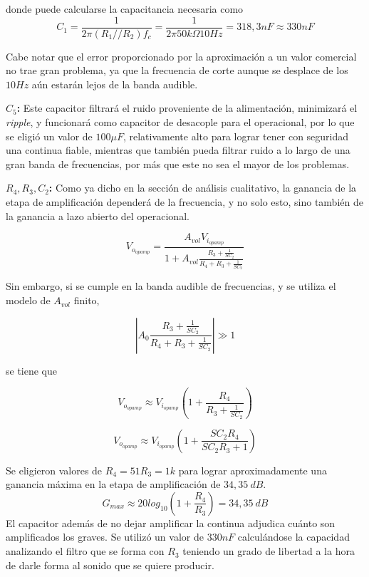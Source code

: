 donde puede calcularse la capacitancia necesaria como
\begin{equation}
C_1=\frac{1}{2\pi (R_1//R_2) f_c} = \frac{1}{2\pi 50k\Omega 10Hz} = 318,3nF \approx 330nF
\end{equation}

Cabe notar que el error proporcionado por la aproximación a un valor comercial no trae gran problema, ya que la frecuencia de corte aunque se desplace de los $10Hz$ aún estarán lejos de la banda audible.

\textbf{$C_5$:} Este capacitor filtrará el ruido proveniente de la alimentación, minimizará el \textit{ripple}, y funcionará como capacitor de desacople para el operacional, por lo que se eligió un valor de $100\mu F$, relativamente alto para lograr tener con seguridad una continua fiable, mientras que también pueda filtrar ruido a lo largo de una gran banda de frecuencias, por más que este no sea el mayor de los problemas.

\textbf{$R_4, R_3, C_2$:} Como ya dicho en la sección de análisis cualitativo, la ganancia de la etapa de amplificación dependerá de la frecuencia, y no solo esto, sino también de la ganancia a lazo abierto del operacional.

\begin{equation}
	V_{o_{opamp}} = \frac{A_{vol} V_{i_{opamp}}}{1+A_{vol} \frac{R_3 + \frac{1}{SC_2}}{R_4 + R_3 + \frac{1}{SC_2}}}
\end{equation}

Sin embargo, si se cumple en la banda audible de frecuencias, y se utiliza el modelo de $A_{vol}$ finito,

\begin{equation}
\left| A_{0}\frac{R_3 + \frac{1}{SC_2}}{R_4 + R_3 + \frac{1}{SC_2}} \right| \gg 1
\label{cond_1/b}
\end{equation}

se tiene que

\begin{equation}
V_{o_{opamp}} \approx V_{i_{opamp}}\left( 1 + \frac{R_4}{R_3 + \frac{1}{SC_2}}  \right)
\end{equation}

\begin{equation}
	V_{o_{opamp}} \approx V_{i_{opamp}}\left( 1 + \frac{SC_2R_4}{SC_2R_3 + 1}  \right)
\end{equation}

Se eligieron valores de $R_4=51R_3=1k$ para lograr aproximadamente una ganancia máxima en la etapa de amplificación de $34,35 \ dB$.
\[G_{max} \approx 20log_{10}(1+\frac{R_4}{R_3}) = 34,35 \ dB\]
El capacitor además de no dejar amplificar la continua adjudica cuánto son amplificados los graves. Se utilizó un valor de $330nF$ calculándose la capacidad analizando el filtro que se forma con $R_3$ teniendo un grado de libertad a la hora de darle forma al sonido que se quiere producir.

